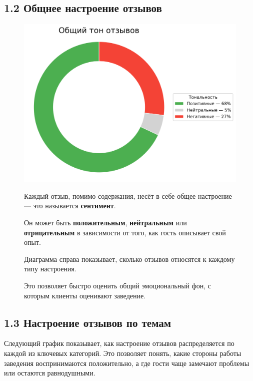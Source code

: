 \documentclass[a4paper,12pt]{extarticle}
\begin{document}
\subsection*{1.2 Общнее настроение отзывов}

\begin{figure}[H]
    \centering
    \begin{minipage}{0.48\textwidth}
        \includegraphics[width=\linewidth]{images/49543885926/sentiment_donut_chart.png}
    \end{minipage}%
    \hfill
    \begin{minipage}{0.48\textwidth}
        \small
        Каждый отзыв, помимо содержания, несёт в себе общее настроение — это называется \textbf{сентимент}.
        \vspace{0.5em}

        Он может быть \textbf{положительным}, \textbf{нейтральным} или \textbf{отрицательным} в зависимости от того, как гость описывает свой опыт.

        \vspace{0.5em}
        Диаграмма справа показывает, сколько отзывов относятся к каждому типу настроения.

        \vspace{0.5em}
        Это позволяет быстро оценить общий эмоциональный фон, с которым клиенты оценивают заведение.
    \end{minipage}
\end{figure}

\subsection*{1.3 Настроение отзывов по темам}
\noindent
Следующий график показывает, как настроение отзывов распределяется по каждой из ключевых категорий.
Это позволяет понять, какие стороны работы заведения воспринимаются положительно, а где гости чаще замечают проблемы или остаются равнодушными.
\end{document}
